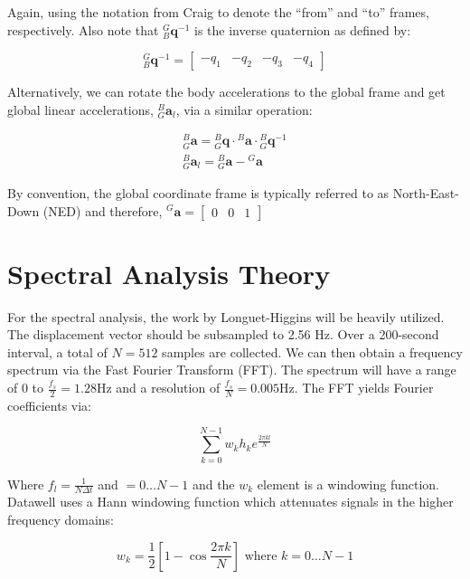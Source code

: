Again, using the notation from Craig to denote the ``from'' and ``to'' frames, respectively. Also note that ${}^G_B\pmb{q}^{-1}$ is the inverse quaternion as defined by:

\begin{equation*}
    {}^G_B\pmb{q}^{-1} = \begin{bmatrix} -q_1 & -q_2 & -q_3 & -q_4 \end{bmatrix}
\end{equation*}

Alternatively, we can rotate the body accelerations to the global frame and get global linear accelerations, ${}^B_G\pmb{a}_l$, via a similar operation:

\begin{gather}
    {}^B_G\pmb{a} = {}^B_G\pmb{q} \cdot {}^B\pmb{a} \cdot {}^B_G\pmb{q}^{-1} \\
    {}^B_G\pmb{a}_l = {}^B_G\pmb{a} - {}^G\pmb{a}
\end{gather}

By convention, the global coordinate frame is typically referred to as North-East-Down (NED) and therefore, ${}^G\pmb{a} = \begin{bmatrix} 0 & 0 & 1 \end{bmatrix}$

\section{Spectral Analysis Theory}

For the spectral analysis, the work by Longuet-Higgins will be heavily utilized. 
The displacement vector should be subsampled to 2.56 Hz. 
Over a 200-second interval, a total of $N=512$ samples are collected. 
We can then obtain a frequency spectrum via the Fast Fourier Transform (FFT). 
The spectrum will have a range of $0$ to $\frac{f_s}{2}=1.28 \text{Hz}$ and a resolution of $\frac{f_s}{N}=0.005 \text{Hz}$.
The FFT yields Fourier coefficients via:

\begin{equation}
    \sum_{k=0}^{N-1} w_k h_k e^{\frac{2\pi kl}{N}}
\end{equation}

Where $f_l=\frac{1}{N\Delta t}$ and $= 0 \ldots N-1$ and the $w_k$ element is a windowing function. 
Datawell uses a Hann windowing function \cite{WaveRider4UserManaul} which attenuates signals in the higher frequency domains:

\begin{equation}
    w_k = \frac{1}{2} [1-\cos{\frac{2\pi k}{N}}] \text{ where } k=0 \ldots N-1
\end{equation}

